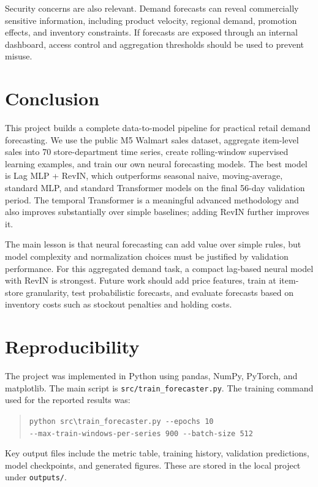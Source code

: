 \documentclass[11pt]{article}
\begin{document}
Security concerns are also relevant. Demand forecasts can reveal commercially sensitive information, including product velocity, regional demand, promotion effects, and inventory constraints. If forecasts are exposed through an internal dashboard, access control and aggregation thresholds should be used to prevent misuse.

\section{Conclusion}

This project builds a complete data-to-model pipeline for practical retail demand forecasting. We use the public M5 Walmart sales dataset, aggregate item-level sales into 70 store-department time series, create rolling-window supervised learning examples, and train our own neural forecasting models. The best model is Lag MLP + RevIN, which outperforms seasonal naive, moving-average, standard MLP, and standard Transformer models on the final 56-day validation period. The temporal Transformer is a meaningful advanced methodology and also improves substantially over simple baselines; adding RevIN further improves it.

The main lesson is that neural forecasting can add value over simple rules, but model complexity and normalization choices must be justified by validation performance. For this aggregated demand task, a compact lag-based neural model with RevIN is strongest. Future work should add price features, train at item-store granularity, test probabilistic forecasts, and evaluate forecasts based on inventory costs such as stockout penalties and holding costs.

\appendix
\section{Reproducibility}

The project was implemented in Python using pandas, NumPy, PyTorch, and matplotlib. The main script is \texttt{src/train\_forecaster.py}. The training command used for the reported results was:

\begin{quote}
\small
\texttt{python src\textbackslash train\_forecaster.py -{}-epochs 10}\\
\texttt{-{}-max-train-windows-per-series 900 -{}-batch-size 512}
\end{quote}

Key output files include the metric table, training history, validation predictions, model checkpoints, and generated figures. These are stored in the local project under \texttt{outputs/}.
\end{document}

